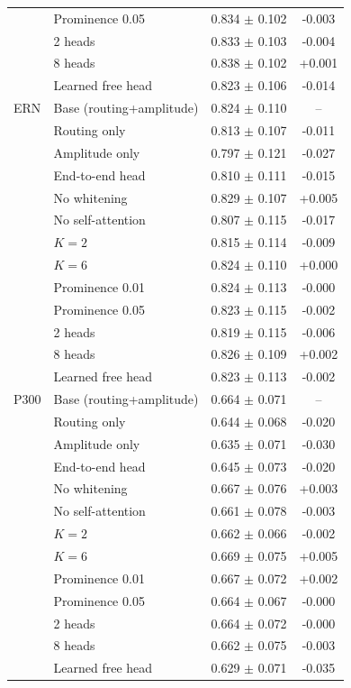 \begin{table}[t]
\begin{tabular}{llcc}
 & Prominence 0.05 & 0.834 $\pm$ 0.102 & -0.003 \\
 & 2 heads & 0.833 $\pm$ 0.103 & -0.004 \\
 & 8 heads & 0.838 $\pm$ 0.102 & +0.001 \\
 & Learned free head & 0.823 $\pm$ 0.106 & -0.014 \\
\midrule
ERN & Base (routing+amplitude) & 0.824 $\pm$ 0.110 & -- \\
 & Routing only & 0.813 $\pm$ 0.107 & -0.011 \\
 & Amplitude only & 0.797 $\pm$ 0.121 & -0.027 \\
 & End-to-end head & 0.810 $\pm$ 0.111 & -0.015 \\
 & No whitening & 0.829 $\pm$ 0.107 & +0.005 \\
 & No self-attention & 0.807 $\pm$ 0.115 & -0.017 \\
 & $K=2$ & 0.815 $\pm$ 0.114 & -0.009 \\
 & $K=6$ & 0.824 $\pm$ 0.110 & +0.000 \\
 & Prominence 0.01 & 0.824 $\pm$ 0.113 & -0.000 \\
 & Prominence 0.05 & 0.823 $\pm$ 0.115 & -0.002 \\
 & 2 heads & 0.819 $\pm$ 0.115 & -0.006 \\
 & 8 heads & 0.826 $\pm$ 0.109 & +0.002 \\
 & Learned free head & 0.823 $\pm$ 0.113 & -0.002 \\
\midrule
P300 & Base (routing+amplitude) & 0.664 $\pm$ 0.071 & -- \\
 & Routing only & 0.644 $\pm$ 0.068 & -0.020 \\
 & Amplitude only & 0.635 $\pm$ 0.071 & -0.030 \\
 & End-to-end head & 0.645 $\pm$ 0.073 & -0.020 \\
 & No whitening & 0.667 $\pm$ 0.076 & +0.003 \\
 & No self-attention & 0.661 $\pm$ 0.078 & -0.003 \\
 & $K=2$ & 0.662 $\pm$ 0.066 & -0.002 \\
 & $K=6$ & 0.669 $\pm$ 0.075 & +0.005 \\
 & Prominence 0.01 & 0.667 $\pm$ 0.072 & +0.002 \\
 & Prominence 0.05 & 0.664 $\pm$ 0.067 & -0.000 \\
 & 2 heads & 0.664 $\pm$ 0.072 & -0.000 \\
 & 8 heads & 0.662 $\pm$ 0.075 & -0.003 \\
 & Learned free head & 0.629 $\pm$ 0.071 & -0.035 \\

\end{tabular}
\end{table}
